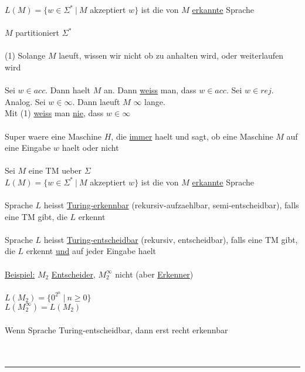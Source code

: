 \documentclass[18pt,a4paper]{scrreprt}
\begin{document}
$L(M) = \{w \in \Sigma^* \:\vert\: M$ akzeptiert $w \}$ ist die von $M$ \uline{erkannte} Sprache\\
\\
$M$ partitioniert $\Sigma^*$\\
\\
(1) Solange $M$ laeuft, wissen wir nicht ob zu anhalten wird, oder weiterlaufen wird\\
\\
Sei $w \in acc$. Dann haelt $M$ an. Dann \uline{weiss} man, dass $w \in acc$. Sei $w \in rej$. Analog. Sei $w \in \infty$. Dann laeuft $M$ $\infty$ lange.\\
Mit (1) \uline{weiss} man \uline{nie}, dass $w \in \infty$\\
\\
Super waere eine Maschine $H$, die \uline{immer} haelt und sagt, ob eine Maschine $M$ auf eine Eingabe $w$ haelt oder nicht\\
\\
Sei $M$ eine TM ueber $\Sigma$\\
$L(M) = \{w \in \Sigma^* \:\vert\: M$ akzeptiert $w \}$ ist die von $M$ \uline{erkannte} Sprache\\
\\
Sprache $L$ heisst \uline{Turing-erkennbar} (rekursiv-aufzaehlbar, semi-entscheidbar), falls eine TM gibt, die $L$ erkennt\\
\\
Sprache $L$ heisst \uline{Turing-entscheidbar} (rekursiv, entscheidbar), falls eine TM gibt, die $L$ erkennt \uline{und} auf jeder Eingabe haelt\\
\\
\uline{Beispiel:} $M_2$ \uline{Entscheider}, $M_2^{\infty}$ nicht (aber \uline{Erkenner})\\
\\
$L(M_2) = \{ 0^{2^n} \:\vert\: n \geq 0\}$\\
$L(M_2^{\infty}) = L(M_2)$\\
\\
Wenn Sprache Turing-entscheidbar, dann erst recht erkennbar\\
\\
\\
\rule{\textwidth}{0.4mm}\\
\\
\end{document}
